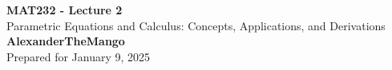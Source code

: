 \begin{titlepage}
    \null %
    \vfill
    \begin{center}
        {\fontsize{40}{48}\selectfont \bfseries MAT232 - Lecture 2}
        \vspace{20pt} \\
        {\LARGE Parametric Equations and Calculus: Concepts, Applications, and Derivations} \\
        \vspace{20pt}
        \textbf{AlexanderTheMango}
        \vspace{8pt}
        \\ Prepared for January 9, 2025
    \end{center}
    \vfill
\end{titlepage}
